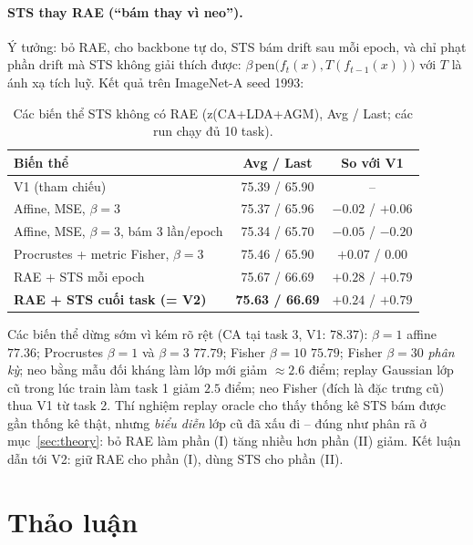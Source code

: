 \documentclass[11pt]{article}
\begin{document}
\paragraph{STS thay RAE (``bám thay vì neo'').} Ý tưởng: bỏ RAE, cho backbone tự do, STS bám drift sau mỗi epoch, và
chỉ phạt phần drift mà STS không giải thích được: $\beta\,\mathrm{pen}\big(f_t(x),T(f_{t-1}(x))\big)$ với $T$ là ánh
xạ tích luỹ. Kết quả trên ImageNet-A seed 1993:

\begin{table}[H]
\centering\small
\caption{Các biến thể STS không có RAE (z(CA+LDA+AGM), Avg / Last; các run chạy đủ 10 task).}
\begin{tabular}{lcc}
\toprule
Biến thể & Avg / Last & So với V1 \\
\midrule
V1 (tham chiếu) & 75.39 / 65.90 & -- \\
Affine, MSE, $\beta=3$ & 75.37 / 65.96 & $-0.02$ / $+0.06$ \\
Affine, MSE, $\beta=3$, bám 3 lần/epoch & 75.34 / 65.70 & $-0.05$ / $-0.20$ \\
Procrustes + metric Fisher, $\beta=3$ & 75.46 / 65.90 & $+0.07$ / $0.00$ \\
RAE + STS mỗi epoch & 75.67 / 66.69 & $+0.28$ / $+0.79$ \\
\textbf{RAE + STS cuối task (= V2)} & \textbf{75.63 / 66.69} & $+0.24$ / $+0.79$ \\
\bottomrule
\end{tabular}
\end{table}

Các biến thể dừng sớm vì kém rõ rệt (CA tại task 3, V1: $78.37$): $\beta=1$ affine $77.36$; Procrustes $\beta=1$ và
$\beta=3$ $77.79$; Fisher $\beta=10$ $75.79$; Fisher $\beta=30$ \emph{phân kỳ}; neo bằng mẫu đối kháng làm lớp mới
giảm $\approx2.6$ điểm; replay Gaussian lớp cũ trong lúc train làm task 1 giảm $2.5$ điểm; neo Fisher (đích là đặc
trưng cũ) thua V1 từ task 2. Thí nghiệm replay oracle cho thấy thống kê STS bám được gần thống kê thật, nhưng
\emph{biểu diễn} lớp cũ đã xấu đi -- đúng như phân rã ở mục~\ref{sec:theory}: bỏ RAE làm phần (I) tăng nhiều hơn phần
(II) giảm. Kết luận dẫn tới V2: giữ RAE cho phần (I), dùng STS cho phần (II).

\section{Thảo luận}\label{sec:discussion}
\end{document}
